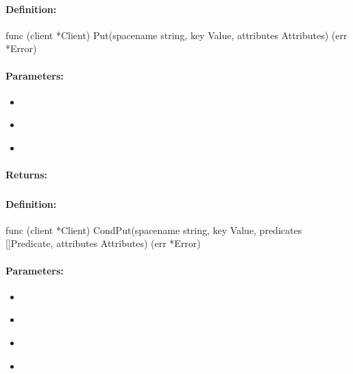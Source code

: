 \paragraph{Definition:}
\begin{gocode}
func (client *Client) Put(spacename string, key Value, attributes Attributes) (err *Error)
\end{gocode}

\paragraph{Parameters:}
\begin{itemize}[noitemsep]
\item {}\\

\item {}\\

\item {}\\

\end{itemize}

\paragraph{Returns:}


\pagebreak
\subsubsection{}
\label{api:Go:CondPut}


\paragraph{Definition:}
\begin{gocode}
func (client *Client) CondPut(spacename string, key Value, predicates []Predicate, attributes Attributes) (err *Error)
\end{gocode}

\paragraph{Parameters:}
\begin{itemize}[noitemsep]
\item {}\\

\item {}\\

\item {}\\

\item {}\\

\end{itemize}

